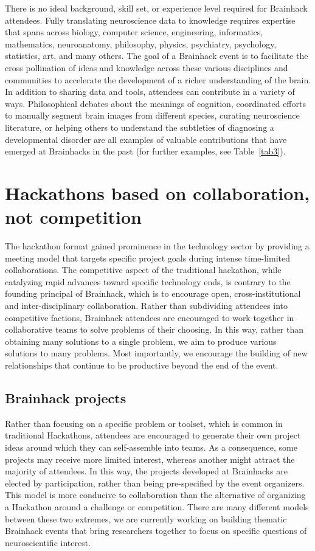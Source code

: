 \documentclass[11pt]{bmc_article_s50}
\begin{document}
There is no ideal background, skill set, or experience level required for Brainhack attendees. Fully translating neuroscience data to knowledge requires expertise that spans across biology, computer science, engineering, informatics, mathematics, neuroanatomy, philosophy, physics, psychiatry, psychology, statistics, art, and many others. The goal of a Brainhack event is to facilitate the cross pollination of ideas and knowledge across these various disciplines and communities to accelerate the development of a richer understanding of the brain. In addition to sharing data and tools, attendees can contribute in a variety of ways. Philosophical debates about the meanings of cognition, coordinated efforts to manually segment brain images from different species, curating neuroscience literature, or helping others to understand the subtleties of diagnosing a developmental disorder are all examples of valuable contributions that have emerged at Brainhacks in the past (for further examples, see Table~\ref{tab3}).

\section{Hackathons based on collaboration, not competition}

The hackathon format gained prominence in the technology sector by providing a meeting model that targets specific project goals during intense time-limited collaborations. The competitive aspect of the traditional hackathon, while catalyzing rapid advances toward specific technology ends, is contrary to the founding principal of Brainhack, which is to encourage open, cross-institutional and inter-disciplinary collaboration. Rather than subdividing attendees into competitive factions, Brainhack attendees are encouraged to work together in collaborative teams to solve problems of their choosing. In this way, rather than obtaining many solutions to a single problem, we aim to produce various solutions to many problems. Most importantly, we encourage the building of new relationships that continue to be productive beyond the end of the event.

\subsection{Brainhack projects}

Rather than focusing on a specific problem or toolset, which is common in traditional Hackathons, attendees are encouraged to generate their own project ideas around which they can self-assemble into teams. As a consequence, some projects may receive more limited interest, whereas another might attract the majority of attendees. In this way, the projects developed at Brainhacks are elected by participation, rather than being pre-specified by the event organizers. This model is more conducive to collaboration than the alternative of organizing a Hackathon around a challenge or competition. There are many different models between these two extremes,  we are currently working on building thematic Brainhack events that bring researchers together to focus on specific questions of neuroscientific interest.
\end{document}
